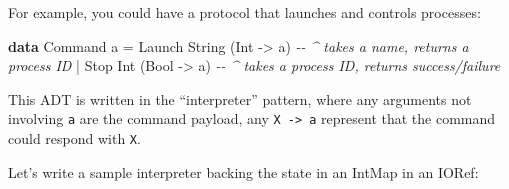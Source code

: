\documentclass[]{article}
\newenvironment{Shaded}{}{}
\newcommand{\CommentTok}[1]{\textcolor[rgb]{0.38,0.63,0.69}{\textit{#1}}}
\newcommand{\DataTypeTok}[1]{\textcolor[rgb]{0.56,0.13,0.00}{#1}}
\newcommand{\KeywordTok}[1]{\textcolor[rgb]{0.00,0.44,0.13}{\textbf{#1}}}
\newcommand{\NormalTok}[1]{#1}
\newcommand{\OperatorTok}[1]{\textcolor[rgb]{0.40,0.40,0.40}{#1}}
\newcommand{\OtherTok}[1]{\textcolor[rgb]{0.00,0.44,0.13}{#1}}
\begin{document}
For example, you could have a protocol that launches and controls processes:

\begin{Shaded}
\begin{Highlighting}[]
\KeywordTok{data} \DataTypeTok{Command}\NormalTok{ a }\OtherTok{=}
    \DataTypeTok{Launch} \DataTypeTok{String}\NormalTok{ (}\DataTypeTok{Int} \OtherTok{{-}\textgreater{}}\NormalTok{ a)    }\CommentTok{{-}{-} \^{} takes a name, returns a process ID}
  \OperatorTok{|} \DataTypeTok{Stop} \DataTypeTok{Int}\NormalTok{ (}\DataTypeTok{Bool} \OtherTok{{-}\textgreater{}}\NormalTok{ a)        }\CommentTok{{-}{-} \^{} takes a process ID, returns success/failure}
\end{Highlighting}
\end{Shaded}

This ADT is written in the ``interpreter'' pattern, where any arguments not
involving \texttt{a} are the command payload, any \texttt{X\ -\textgreater{}\ a}
represent that the command could respond with \texttt{X}.

Let's write a sample interpreter backing the state in an IntMap in an IORef:
\end{document}
